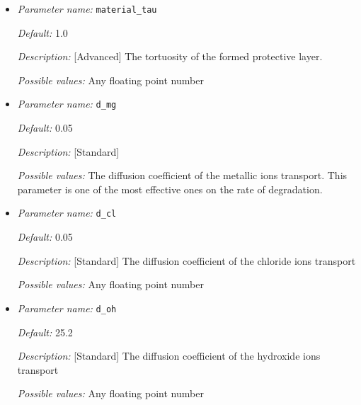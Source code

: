 \begin{itemize}
{\it Default:} 0.55

{\it Description:} [Advanced] The porosity of the formed protective layer in the range [0, 1].

{\it Possible values:} Any floating point number between 0 and 1


\item {\it Parameter name:} {\tt material\_tau}
\label{parameters:material_tau}


{\it Default:} 1.0

{\it Description:} [Advanced] The tortuosity of the formed protective layer.

{\it Possible values:} Any floating point number


\item {\it Parameter name:} {\tt d\_mg}
\label{parameters:d_mg}


{\it Default:} 0.05

{\it Description:} [Standard] 

{\it Possible values:} The diffusion coefficient of the metallic ions transport. This parameter is one of the most effective ones on the rate of degradation.


\item {\it Parameter name:} {\tt d\_cl}
\label{parameters:d_cl}


{\it Default:} 0.05

{\it Description:} [Standard] The diffusion coefficient of the chloride ions transport

{\it Possible values:} Any floating point number


\item {\it Parameter name:} {\tt d\_oh}
\label{parameters:d_oh}


{\it Default:} 25.2

{\it Description:} [Standard] The diffusion coefficient of the hydroxide ions transport

{\it Possible values:} Any floating point number



\end{itemize}
